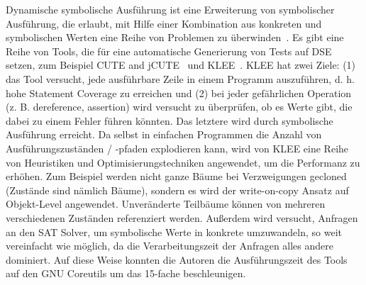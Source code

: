 \documentclass{article}
\begin{document}
Dynamische symbolische Ausführung ist eine Erweiterung von symbolischer Ausführung, die erlaubt, mit Hilfe einer Kombination aus konkreten und symbolischen Werten eine Reihe von Problemen zu überwinden~\cite{Fraser_2013}. Es gibt eine Reihe von Tools, die für eine automatische Generierung von Tests auf DSE setzen, zum Beispiel CUTE and jCUTE~\cite{Sen2006} und KLEE~\cite{cadar2008klee}. KLEE hat zwei Ziele: (1) das Tool versucht, jede ausführbare Zeile in einem Programm auszuführen, d. h. hohe Statement Coverage zu erreichen und (2) bei jeder gefährlichen Operation (z. B. dereference, assertion) wird versucht zu überprüfen, ob es Werte gibt, die dabei zu einem Fehler führen könnten. Das letztere wird durch symbolische Ausführung erreicht. Da selbst in einfachen Programmen die Anzahl von Ausführungszuständen / -pfaden explodieren kann, wird von KLEE eine Reihe von Heuristiken und Optimisierungstechniken angewendet, um die Performanz zu erhöhen. Zum Beispiel werden nicht ganze Bäume bei Verzweigungen gecloned (Zustände sind nämlich Bäume), sondern es wird der write-on-copy Ansatz auf Objekt-Level angewendet. Unveränderte Teilbäume können von mehreren verschiedenen Zuständen referenziert werden. Außerdem wird versucht, Anfragen an den SAT Solver, um symbolische Werte in konkrete umzuwandeln, so weit vereinfacht wie möglich, da die Verarbeitungszeit der Anfragen alles andere dominiert. Auf diese Weise konnten die Autoren die Ausführungszeit des Tools auf den GNU Coreutils um das 15-fache beschleunigen.
\end{document}
